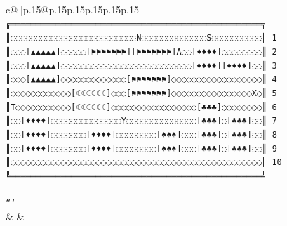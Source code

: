 \documentclass{article}
\begin{document}
{\begin{supertabular}{c@{$\;$}|p{.15\linewidth}@{}p{.15\linewidth}p{.15\linewidth}p{.15\linewidth}p{.15\linewidth}p{.15\linewidth}}
{{{\texttt{╔══════════════════════════════════════════════════╗} \\
\texttt{║◌◌◌◌◌◌◌◌◌◌◌◌◌◌◌◌◌◌◌◌◌◌◌◌◌N◌◌◌◌◌◌◌◌◌◌◌◌◌S◌◌◌◌◌◌◌◌◌◌║ 1} \\
\texttt{║◌◌◌{[}▲▲▲▲▲{]}◌◌◌◌◌{[}⚑⚑⚑⚑⚑⚑⚑{]}{[}⚑⚑⚑⚑⚑⚑⚑{]}A◌◌{[}♦♦♦♦{]}◌◌◌◌◌◌◌◌║ 2} \\
\texttt{║◌◌◌{[}▲▲▲▲▲{]}◌◌◌◌◌◌◌◌◌◌◌◌◌◌◌◌◌◌◌◌◌◌◌◌◌◌{[}♦♦♦♦{]}{[}♦♦♦♦{]}◌◌║ 3} \\
\texttt{║◌◌◌{[}▲▲▲▲▲{]}◌◌◌◌◌◌◌◌◌◌◌◌◌{[}⚑⚑⚑⚑⚑⚑⚑{]}◌◌◌◌◌◌◌◌◌◌◌◌◌◌◌◌◌◌║ 4} \\
\texttt{║◌◌◌◌◌◌◌◌◌◌◌◌{[}☾☾☾☾☾☾{]}◌◌◌{[}⚑⚑⚑⚑⚑⚑⚑{]}◌◌◌◌◌◌◌◌◌◌◌◌◌◌◌◌X◌║ 5} \\
\texttt{║T◌◌◌◌◌◌◌◌◌◌◌{[}☾☾☾☾☾☾{]}◌◌◌◌◌◌◌◌◌◌◌◌◌◌◌◌◌{[}♣♣♣{]}◌◌◌◌◌◌◌◌║ 6} \\
\texttt{║◌◌{[}♦♦♦♦{]}◌◌◌◌◌◌◌◌◌◌◌◌◌◌Y◌◌◌◌◌◌◌◌◌◌◌◌◌◌{[}♣♣♣{]}◌{[}♣♣♣{]}◌◌║ 7} \\
\texttt{║◌◌{[}♦♦♦♦{]}◌◌◌◌◌◌◌{[}♦♦♦♦{]}◌◌◌◌◌◌◌◌{[}♠♠♠{]}◌◌◌{[}♣♣♣{]}◌{[}♣♣♣{]}◌◌║ 8} \\
\texttt{║◌◌{[}♦♦♦♦{]}◌◌◌◌◌◌◌{[}♦♦♦♦{]}◌◌◌◌◌◌◌◌{[}♠♠♠{]}◌◌◌{[}♣♣♣{]}◌{[}♣♣♣{]}◌◌║ 9} \\
\texttt{║◌◌◌◌◌◌◌◌◌◌◌◌◌◌◌◌◌◌◌◌◌◌◌◌◌◌◌◌◌◌◌◌◌◌◌◌◌◌◌◌◌◌◌◌◌◌◌◌◌◌║ 10} \\
\texttt{╚══════════════════════════════════════════════════╝} \\
\\ 
\texttt{```} \\
            }
        }
    }
    & & \\ \\


\end{supertabular}}
\end{document}
